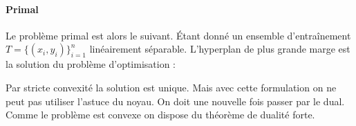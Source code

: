 \paragraph{Primal}
Le problème primal est alors le suivant. Étant donné un ensemble d'entraînement $T = \{ (x_i, y_i) \}_{i=1}^n$ linéairement séparable. L'hyperplan de plus grande marge est la solution du problème d'optimisation :
\begin{center}
\end{center}
Par stricte convexité la solution est unique. Mais avec cette formulation on ne peut pas utiliser l'astuce du noyau. On doit une nouvelle fois passer par le dual. Comme le problème est convexe on dispose du théorème de dualité forte.

